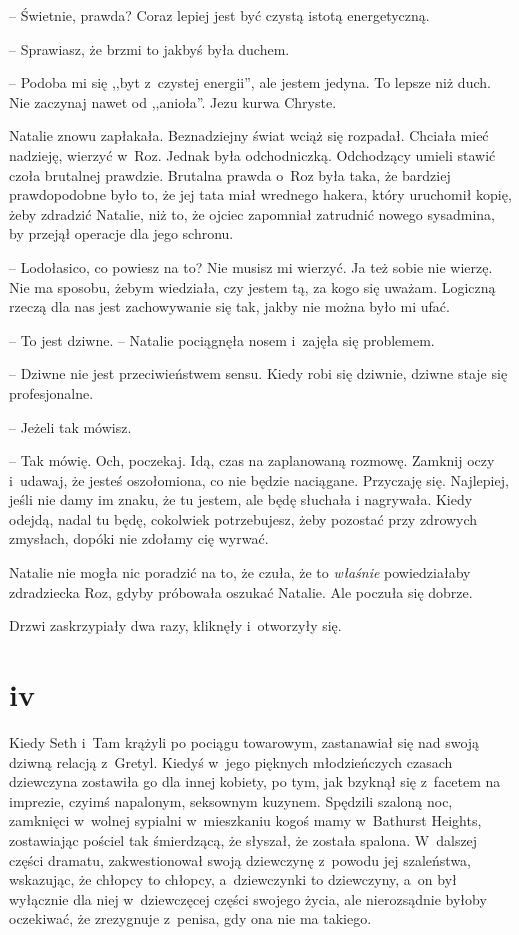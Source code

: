 \documentclass[oneside,polish,11pt,sfheadings]{mwbk}
\begin{document}
-- Świetnie, prawda? Coraz lepiej jest być czystą istotą energetyczną.

-- Sprawiasz, że brzmi to jakbyś była duchem.

-- Podoba mi się ,,byt z~czystej energii'', ale jestem jedyna. To lepsze
niż duch. Nie zaczynaj nawet od ,,anioła''. Jezu kurwa Chryste.

Natalie znowu zapłakała. Beznadziejny świat wciąż się rozpadał. Chciała
mieć nadzieję, wierzyć w~Roz. Jednak była odchodniczką. Odchodzący
umieli stawić czoła brutalnej prawdzie. Brutalna prawda o~Roz była taka,
że bardziej prawdopodobne było to, że jej tata miał wrednego hakera,
który uruchomił kopię, żeby zdradzić Natalie, niż to, że ojciec
zapomniał zatrudnić nowego sysadmina, by przejął operacje dla jego
schronu.

-- Lodołasico, co powiesz na to? Nie musisz mi wierzyć. Ja też sobie nie
wierzę. Nie ma sposobu, żebym wiedziała, czy jestem tą, za kogo się
uważam. Logiczną rzeczą dla nas jest zachowywanie się tak, jakby nie
można było mi ufać.

-- To jest dziwne. -- Natalie pociągnęła nosem i~zajęła się problemem.

-- Dziwne nie jest przeciwieństwem sensu. Kiedy robi się dziwnie, dziwne
staje się profesjonalne.

-- Jeżeli tak mówisz.

-- Tak mówię. Och, poczekaj. Idą, czas na zaplanowaną rozmowę. Zamknij
oczy i~udawaj, że jesteś oszołomiona, co nie będzie naciągane. Przyczaję
się. Najlepiej, jeśli nie damy im znaku, że tu jestem, ale będę słuchała
i nagrywała. Kiedy odejdą, nadal tu będę, cokolwiek potrzebujesz, żeby
pozostać przy zdrowych zmysłach, dopóki nie zdołamy cię wyrwać.

Natalie nie mogła nic poradzić na to, że czuła, że to \textit{właśnie}
powiedziałaby zdradziecka Roz, gdyby próbowała oszukać Natalie. Ale
poczuła się dobrze.

Drzwi zaskrzypiały dwa razy, kliknęły i~otworzyły się.

\chapter*{iv}


Kiedy Seth i~Tam krążyli po pociągu towarowym, zastanawiał się nad swoją
dziwną relacją z~Gretyl. Kiedyś w~jego pięknych młodzieńczych czasach
dziewczyna zostawiła go dla innej kobiety, po tym, jak bzyknął się z~facetem na imprezie, czyimś napalonym, seksownym kuzynem. Spędzili
szaloną noc, zamknięci w~wolnej sypialni w~mieszkaniu kogoś mamy w~Bathurst Heights, zostawiając pościel tak śmierdzącą, że słyszał, że
została spalona. W~dalszej części dramatu, zakwestionował swoją
dziewczynę z~powodu jej szaleństwa, wskazując, że chłopcy to chłopcy, a~dziewczynki to dziewczyny, a~on był wyłącznie dla niej w~dziewczęcej
części swojego życia, ale nierozsądnie byłoby oczekiwać, że zrezygnuje z~penisa, gdy ona nie ma takiego.
\end{document}
